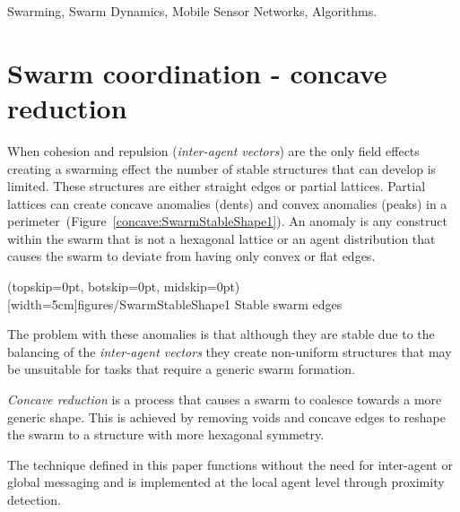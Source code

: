\documentclass{ieeeaccess}
\begin{document}
\begin{IEEEkeywords}
Swarming, Swarm Dynamics, Mobile Sensor Networks, Algorithms.
\end{IEEEkeywords}


\titlepgskip=-15pt
\maketitle

\section{Swarm coordination - concave reduction}\label{chapter:ConcaveReduction}
When cohesion and repulsion (\textit{inter-agent vectors}) are the only field effects creating a swarming effect the number of stable structures that can develop is limited. These structures are either straight edges or partial lattices. Partial lattices can create concave anomalies (dents) and convex anomalies (peaks) in a perimeter~(Figure~\ref{concave:SwarmStableShape1}). An anomaly is any construct within the swarm that is not a hexagonal lattice or an agent distribution that causes the swarm to deviate from having only convex or flat edges. 

\Figure[t!](topskip=0pt, botskip=0pt, midskip=0pt)[width=5cm]{figures/SwarmStableShape1}
{Stable swarm edges\label{concave:SwarmStableShape1}}


The problem with these anomalies is that although they are stable due to the balancing of the \textit{inter-agent vectors} they create non-uniform structures that may be unsuitable for tasks that require a generic swarm formation.

\textit{Concave reduction} is a process that causes a swarm to coalesce towards a more generic shape. This is achieved by removing voids and concave edges to reshape the swarm to a structure with more hexagonal symmetry.  

The technique defined in this paper functions without the need for inter-agent or global messaging and is implemented at the local agent level through proximity detection.
\end{document}
